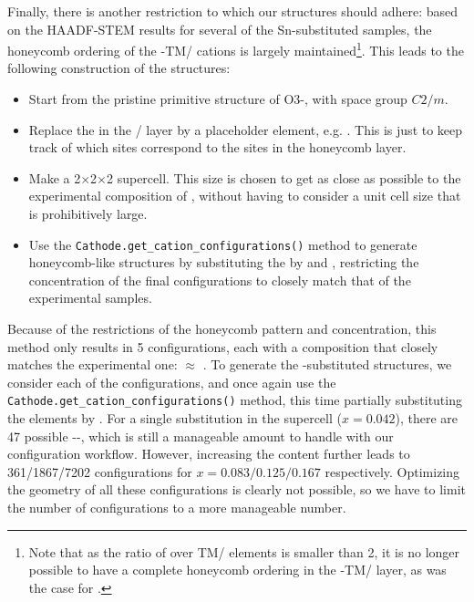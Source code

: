 \begin{refsection}
Finally, there is another restriction to which our structures should adhere: 
based on the \gls{HAADF}-STEM results for several of the Sn-substituted samples, the 
honeycomb ordering of the -TM/ cations is largely 
maintained\footnote{Note that as the ratio of  over \gls{TM}/ elements 
is smaller than 2, it is no longer possible to have a complete honeycomb 
ordering in the  -TM/ layer, as was the case for .}. 
This leads to the following construction of the  
structures:  
\begin{itemize} 
\item Start from the pristine primitive structure of O3-, with 
space group $C2/m$. 
\item Replace the  in the / layer by a placeholder 
element, e.g. . This is just to keep track of which sites correspond to 
the  sites in the honeycomb layer. 
\item Make a 2$\times$2$\times$2 supercell. This size is chosen to get as close as possible 
to the experimental composition of , without having to consider a unit 
cell size that is prohibitively large. 
\item Use the \texttt{Cathode.get\_cation\_configurations()} method to 
generate honeycomb-like structures by substituting the  by  and 
, restricting the  concentration of the final configurations to 
closely match that of the experimental samples. 
\end{itemize} 
Because of the restrictions of the honeycomb pattern and  
concentration, this method only results in 5 configurations, each with a 
composition that closely matches the experimental one: 
 $\approx$ . To generate 
the -substituted structures, we consider each of the  
configurations, and once again use the 
\texttt{Cathode.get\_cation\_configurations()} method, this time partially 
substituting the  elements by . For a single  
substitution in the supercell ($x = 0.042$), there are 47 possible 
--, which is still a manageable amount to handle with our 
configuration workflow. However, increasing the  content further leads 
to 361/1867/7202 configurations for $x = 0.083/0.125/0.167$ respectively. 
Optimizing the geometry of all these configurations is clearly not possible, 
so we have to limit the number of configurations to a more manageable number.  
 

\end{refsection}
